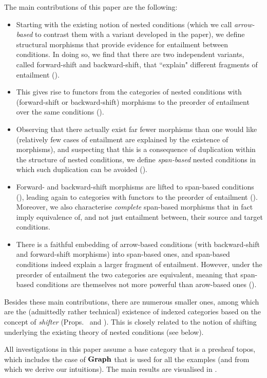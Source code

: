 The main contributions of this paper are the following:

\begin{itemize}
\item Starting with the existing notion of nested conditions (which we call \emph{arrow-based} to contrast them with a variant developed in the paper), we define structural morphisms that provide evidence for entailment between conditions. In doing so, we find that there are two independent variants, called forward-shift and backward-shift, that ``explain" different fragments of entailment ().

\item This gives rise to functors from the categories of nested conditions with (forward-shift or backward-shift) morphisms to the preorder of entailment over the same conditions ().

\item Observing that there actually exist far fewer morphisms than one would like (relatively few cases of entailment are explained by the existence of morphisms), and suspecting that this is a consequence of duplication within the structure of nested conditions, we define \emph{span-based} nested conditions in which such duplication can be avoided ().

\item Forward- and backward-shift morphisms are lifted to span-based conditions (), leading again to categories with functors to the preorder of entailment (). Moreover, we also characterise \emph{complete} span-based morphisms that in fact imply equivalence of, and not just entailment between, their source and target conditions.

\item There is a faithful embedding of arrow-based conditions (with backward-shift and forward-shift morphisms) into span-based ones, and span-based conditions indeed explain a larger fragment of entailment. However, under the preorder of entailment the two categories are equivalent, meaning that span-based conditions are themselves not more powerful than arow-based ones ().
\end{itemize}
%
Besides these main contributions, there are numerous smaller ones, among which are the (admittedly rather technical) existence of indexed categories based on the concept of \emph{shifter} (Props.\  and ). This is closely related to the notion of shifting underlying the existing theory of nested conditions (see below).

All investigations in this paper assume a base category that is a presheaf topos, which includes the case of $\textbf{Graph}$ that is used for all the examples (and from which we derive our intuitions). The main results are visualised in .
